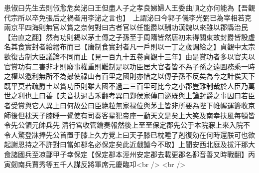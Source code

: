 患俶曰先生去則俶愈危矣泌曰王但盡人子之孝良娣婦人王委曲順之亦何能為【吾觀代宗所以卒免張后之禍者用李泌之言也】　上謂泌曰今郭子儀李光弼已為宰相若克兩京平四海則無官以賞之奈何對曰古者官以任能爵以酬功漢魏以來雖以郡縣治民【治直之翻】然有功則錫以茅土傳之子孫至于周隋皆然唐初未得關東故封爵皆設虚名其食實封者給繒布而已【唐制食實封者凡一戶則以一丁之歲調給之】貞觀中太宗欲復古制大臣議論不同而止【見一百九十五卷貞觀十三年】由是賞功者多以官夫以官賞功有二害非才則廢事權重則難制是以功臣居大官者皆不為子孫之遠圖務乘一時之權以邀利無所不為曏使祿山有百里之國則亦惜之以傳子孫不反矣為今之計俟天下既平莫若疏爵土以賞功臣則雖大國不過二三百里可比今之小郡豈難制哉於人臣乃萬世之利也上曰善【夫音扶過古禾翻考異曰鄴侯家傳曰泌既與上論封爵之事因曰若臣者受賞與它人異上曰何故公曰臣絶粒無家禄位與茅土皆非所要為陛下帷幄運籌收京師後但枕天子膝睡一覺使有司奏客星犯帝座一動天文是矣上大笑及南幸扶風每頓皆令先公領元帥兵先清行宫收管鑰奏報然後上至至保定郡先公于本院寐上來入院不令人驚登牀捧先公首置于膝上久方覺上曰天子膝已枕睡了剋復効在何時還朕可也欲起謝恩持之不許對曰當如郡名必保定矣此近戲謔今不取】上聞安西北庭及拔汗那大食諸國兵至凉鄯甲子幸保定【保定郡本涇州安定郡去載更郡名鄯音善又時戰翻】丙寅劒南兵賈秀等五千人謀反將軍席元慶臨卭<br />
<br />
